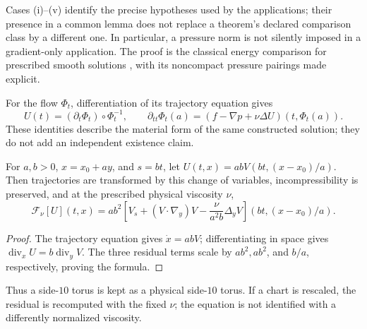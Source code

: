 Cases (i)--(v) identify the precise hypotheses used by the applications;
their presence in a common lemma does not replace a theorem's declared
comparison class by a different one. In particular, a pressure norm is not
silently imposed in a gradient-only application. The proof is the classical
energy comparison for prescribed smooth solutions \cite[Section~18]{Leray1934},
with its noncompact pressure pairings made explicit.

For the flow $\Phi_t$, differentiation of its trajectory equation gives
\[
 U(t)=(\partial_t\Phi_t)\circ\Phi_t^{-1},\qquad
 \partial_{tt}\Phi_t(a)=
 (f-\nabla p+\nu\Delta U)(t,\Phi_t(a)).
\]
These identities describe the material form of the same constructed solution;
they do not add an independent existence claim.

\begin{lemma}\label{lem:p2-chart}
For $a,b>0$, $x=x_0+ay$, and $s=bt$, let
$U(t,x)=abV(bt,(x-x_0)/a)$. Then trajectories are transformed by this change
of variables, incompressibility is preserved, and at the prescribed physical
viscosity $\nu$,
\[
 \mathcal F_\nu[U](t,x)=ab^2\left[
 V_s+(V\cdot\nabla_y)V-\frac{\nu}{a^2b}\Delta_yV
 \right](bt,(x-x_0)/a).
\]
\end{lemma}
\begin{proof}
The trajectory equation gives $\dot x=abV$; differentiating in space gives
$\operatorname{div}_xU=b\operatorname{div}_yV$. The three residual terms
scale by $ab^2,ab^2$, and $b/a$, respectively, proving the formula.
\end{proof}
Thus a side-$10$ torus is kept as a physical side-$10$ torus. If a chart
is rescaled, the residual is recomputed with the fixed $\nu$; the equation
is not identified with a differently normalized viscosity.


